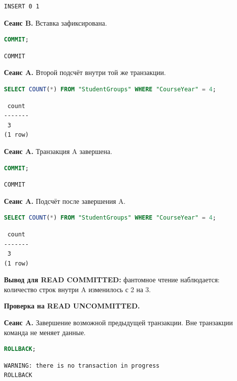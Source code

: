 \documentclass[12pt,a4paper]{article}
\begin{document}
\begin{lstlisting}
INSERT 0 1
\end{lstlisting}

\textbf{Сеанс B.} Вставка зафиксирована.
\begin{lstlisting}[language=SQL]
COMMIT;
\end{lstlisting}

\begin{lstlisting}
COMMIT
\end{lstlisting}

\textbf{Сеанс A.} Второй подсчёт внутри той же транзакции.
\begin{lstlisting}[language=SQL]
SELECT COUNT(*) FROM "StudentGroups" WHERE "CourseYear" = 4;
\end{lstlisting}

\begin{lstlisting}
 count
-------
 3
(1 row)
\end{lstlisting}

\textbf{Сеанс A.} Транзакция A завершена.
\begin{lstlisting}[language=SQL]
COMMIT;
\end{lstlisting}

\begin{lstlisting}
COMMIT
\end{lstlisting}

\textbf{Сеанс A.} Подсчёт после завершения A.
\begin{lstlisting}[language=SQL]
SELECT COUNT(*) FROM "StudentGroups" WHERE "CourseYear" = 4;
\end{lstlisting}

\begin{lstlisting}
 count
-------
 3
(1 row)
\end{lstlisting}

\textbf{Вывод для READ COMMITTED:} фантомное чтение наблюдается: количество строк внутри A изменилось с 2 на 3.

\textbf{Проверка на READ UNCOMMITTED.}

\textbf{Сеанс A.} Завершение возможной предыдущей транзакции. Вне транзакции команда не меняет данные.
\begin{lstlisting}[language=SQL]
ROLLBACK;
\end{lstlisting}

\begin{lstlisting}
WARNING: there is no transaction in progress
ROLLBACK
\end{lstlisting}
\end{document}
